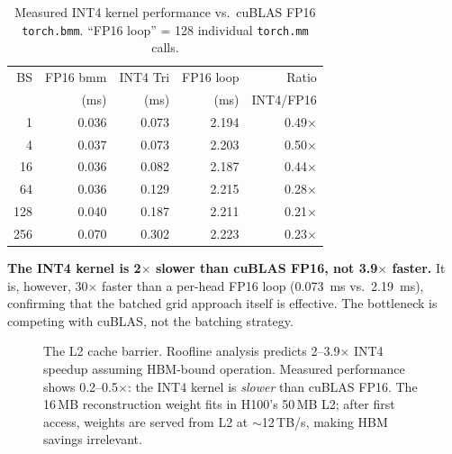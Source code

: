 \documentclass[10pt,twocolumn]{article}
\begin{document}
\begin{table}[h]
\centering
\small
\caption{Measured INT4 kernel performance vs.\ cuBLAS FP16 \texttt{torch.bmm}.  ``FP16 loop'' = 128 individual \texttt{torch.mm} calls.}
\label{tab:int4_measured}
\begin{tabular}{@{}rrrrr@{}}
\toprule
BS & FP16 bmm & INT4 Tri & FP16 loop & Ratio \\
   & (ms) & (ms) & (ms) & INT4/FP16 \\
\midrule
  1 & 0.036 & 0.073 & 2.194 & 0.49$\times$ \\
  4 & 0.037 & 0.073 & 2.203 & 0.50$\times$ \\
 16 & 0.036 & 0.082 & 2.187 & 0.44$\times$ \\
 64 & 0.036 & 0.129 & 2.215 & 0.28$\times$ \\
128 & 0.040 & 0.187 & 2.211 & 0.21$\times$ \\
256 & 0.070 & 0.302 & 2.223 & 0.23$\times$ \\
\bottomrule
\end{tabular}
\end{table}

\textbf{The INT4 kernel is 2$\times$ slower than cuBLAS FP16, not 3.9$\times$ faster.}  It is, however, 30$\times$ faster than a per-head FP16 loop (0.073~ms vs.\ 2.19~ms), confirming that the batched grid approach itself is effective.  The bottleneck is competing with cuBLAS, not the batching strategy.

\begin{figure}[t]
\centering
{}
\caption{The L2 cache barrier.  Roofline analysis predicts 2--3.9$\times$ INT4 speedup assuming HBM-bound operation.  Measured performance shows 0.2--0.5$\times$: the INT4 kernel is \emph{slower} than cuBLAS FP16.  The 16\,MB reconstruction weight fits in H100's 50\,MB L2; after first access, weights are served from L2 at ${\sim}$12\,TB/s, making HBM savings irrelevant.}
\label{fig:l2barrier}
\end{figure}
\end{document}
